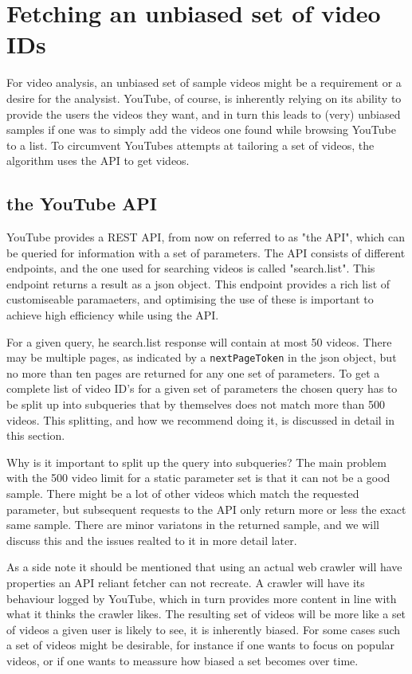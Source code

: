 \section{Fetching an unbiased set of video IDs}
For video analysis, an unbiased set of sample videos might be a requirement or
a desire for the analysist. YouTube, of course, is inherently relying on its
ability to provide the users the videos they want, and in turn this leads to
(very) unbiased samples if one was to simply add the videos one found while
browsing YouTube to a list. To circumvent YouTubes attempts at tailoring a set
of videos, the algorithm uses the API to get videos.

\subsection{the YouTube API}
YouTube provides a REST API, from now on referred to as "the API", which can be
queried for information with a set of parameters. The API consists of different
endpoints, and the one used for searching videos is called "search.list". This
endpoint returns a result as a json object. This endpoint provides a rich list
of customiseable paramaeters, and optimising the use of these is important to
achieve high efficiency while using the API. 

For a given query, he search.list response will contain at most 50 videos. There
may be multiple pages, as indicated by a \texttt{nextPageToken} in the json
object, but no more than ten pages are returned for any one set of parameters.
To get a complete list of video ID's for a given set of parameters the chosen
query has to be split up into subqueries that by themselves does not match more
than 500 videos. This splitting, and how we recommend doing it, is discussed in
detail in this section.

Why is it important to split up the query into subqueries? The main problem with
the 500 video limit for a static parameter set is that it can not be a good
sample. There might be a lot of other videos which match the requested
parameter, but subsequent requests to the API only return more or less the exact
same sample. There are minor variatons in the returned sample, and we will 
discuss this and the issues realted to it in more detail later. 

As a side note it should be mentioned that using an actual web crawler will have
properties an API reliant fetcher can not recreate. A crawler will have its 
behaviour logged by YouTube, which in turn provides more content in line with
what it thinks the crawler likes. The resulting set of videos will be more like
a set of videos a given user is likely to see, it is inherently biased. For some
cases such a set of videos might be desirable, for instance if one wants to
focus on popular videos, or if one wants to meassure how biased a set becomes
over time.

